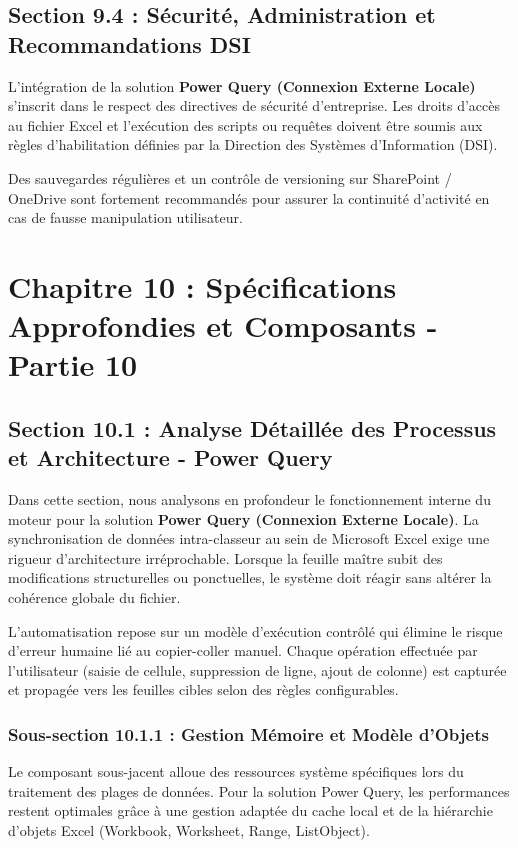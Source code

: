 \documentclass[12pt,a4paper]{report}
\begin{document}
\section{Section 9.4 : Sécurité, Administration et Recommandations DSI}
L'intégration de la solution \textbf{Power Query (Connexion Externe Locale)} s'inscrit dans le respect des directives de sécurité d'entreprise. Les droits d'accès au fichier Excel et l'exécution des scripts ou requêtes doivent être soumis aux règles d'habilitation définies par la Direction des Systèmes d'Information (DSI).

Des sauvegardes régulières et un contrôle de versioning sur SharePoint / OneDrive sont fortement recommandés pour assurer la continuité d'activité en cas de fausse manipulation utilisateur.


\chapter{Chapitre 10 : Spécifications Approfondies et Composants - Partie 10}

\section{Section 10.1 : Analyse Détaillée des Processus et Architecture - Power Query}
Dans cette section, nous analysons en profondeur le fonctionnement interne du moteur pour la solution \textbf{Power Query (Connexion Externe Locale)}. La synchronisation de données intra-classeur au sein de Microsoft Excel exige une rigueur d'architecture irréprochable. Lorsque la feuille maître subit des modifications structurelles ou ponctuelles, le système doit réagir sans altérer la cohérence globale du fichier.

L'automatisation repose sur un modèle d'exécution contrôlé qui élimine le risque d'erreur humaine lié au copier-coller manuel. Chaque opération effectuée par l'utilisateur (saisie de cellule, suppression de ligne, ajout de colonne) est capturée et propagée vers les feuilles cibles selon des règles configurables.


\subsection{Sous-section 10.1.1 : Gestion Mémoire et Modèle d'Objets}
Le composant sous-jacent alloue des ressources système spécifiques lors du traitement des plages de données. Pour la solution Power Query, les performances restent optimales grâce à une gestion adaptée du cache local et de la hiérarchie d'objets Excel (Workbook, Worksheet, Range, ListObject).
\end{document}
